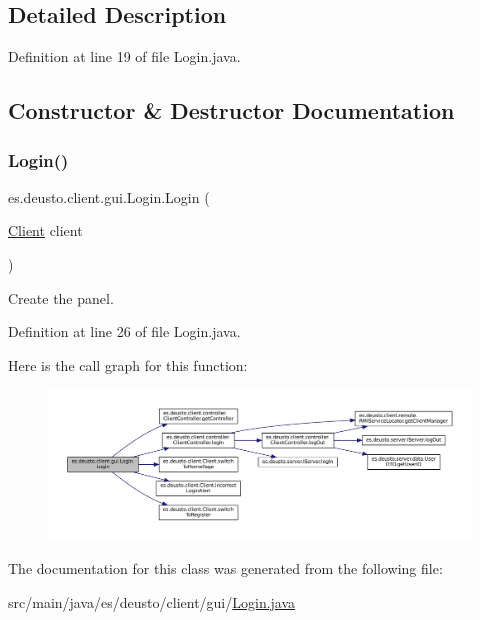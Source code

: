 \subsection{Detailed Description}


Definition at line 19 of file Login.\+java.



\subsection{Constructor \& Destructor Documentation}
\mbox{\label{classes_1_1deusto_1_1client_1_1gui_1_1_login_af565f7accded6e1e3d09b03d6baeaeb4}} 
\subsubsection{\texorpdfstring{Login()}{Login()}}
{\footnotesize\ttfamily es.\+deusto.\+client.\+gui.\+Login.\+Login (\begin{DoxyParamCaption}\item[{\mbox{\hyperlink{classes_1_1deusto_1_1client_1_1_client}{Client}}}]{client }\end{DoxyParamCaption})}

Create the panel. 

Definition at line 26 of file Login.\+java.

Here is the call graph for this function\+:
\nopagebreak
\begin{figure}[H]
\begin{center}
\leavevmode
\includegraphics[width=350pt]{classes_1_1deusto_1_1client_1_1gui_1_1_login_af565f7accded6e1e3d09b03d6baeaeb4_cgraph}
\end{center}
\end{figure}


The documentation for this class was generated from the following file\+:\begin{DoxyCompactItemize}
\item 
src/main/java/es/deusto/client/gui/\mbox{\hyperlink{_login_8java}{Login.\+java}}\end{DoxyCompactItemize}
